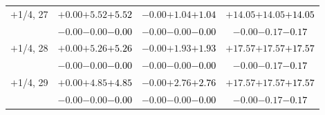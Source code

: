 \documentclass[compress]{beamer}
\begin{document}
\begin{frame}
\begin{tabular}{r | c | c | c}
$+$1/4, 27 & $+0.00$\hspace{0.1 cm}$+5.52$\hspace{0.1 cm}\textcolor{black}{$+5.52$} & $-0.00$\hspace{0.1 cm}$+1.04$\hspace{0.1 cm}\textcolor{black}{$+1.04$} & $+14.05$\hspace{0.1 cm}$+14.05$\hspace{0.1 cm}\textcolor{black}{$+14.05$} \\
           & $-0.00$\hspace{0.1 cm}$-0.00$\hspace{0.1 cm}\textcolor{black}{$-0.00$} & $-0.00$\hspace{0.1 cm}$-0.00$\hspace{0.1 cm}\textcolor{black}{$-0.00$} & $-0.00$\hspace{0.1 cm}$-0.17$\hspace{0.1 cm}\textcolor{black}{$-0.17$} \\
$+$1/4, 28 & $+0.00$\hspace{0.1 cm}$+5.26$\hspace{0.1 cm}\textcolor{black}{$+5.26$} & $-0.00$\hspace{0.1 cm}$+1.93$\hspace{0.1 cm}\textcolor{black}{$+1.93$} & $+17.57$\hspace{0.1 cm}$+17.57$\hspace{0.1 cm}\textcolor{black}{$+17.57$} \\
           & $-0.00$\hspace{0.1 cm}$-0.00$\hspace{0.1 cm}\textcolor{black}{$-0.00$} & $-0.00$\hspace{0.1 cm}$-0.00$\hspace{0.1 cm}\textcolor{black}{$-0.00$} & $-0.00$\hspace{0.1 cm}$-0.17$\hspace{0.1 cm}\textcolor{black}{$-0.17$} \\
$+$1/4, 29 & $+0.00$\hspace{0.1 cm}$+4.85$\hspace{0.1 cm}\textcolor{black}{$+4.85$} & $-0.00$\hspace{0.1 cm}$+2.76$\hspace{0.1 cm}\textcolor{black}{$+2.76$} & $+17.57$\hspace{0.1 cm}$+17.57$\hspace{0.1 cm}\textcolor{black}{$+17.57$} \\
           & $-0.00$\hspace{0.1 cm}$-0.00$\hspace{0.1 cm}\textcolor{black}{$-0.00$} & $-0.00$\hspace{0.1 cm}$-0.00$\hspace{0.1 cm}\textcolor{black}{$-0.00$} & $-0.00$\hspace{0.1 cm}$-0.17$\hspace{0.1 cm}\textcolor{black}{$-0.17$} \\

\end{tabular}
\end{frame}
\end{document}
